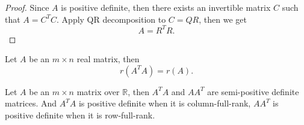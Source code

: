 \begin{proof}
  Since $A$ is positive definite, then there exists an invertible matrix $C$
  such that $A = C^TC$.
  Apply QR decomposition to $C = QR$, then we get
  \begin{equation}
    A = R^TR.
  \end{equation}
\end{proof}

\begin{lemma}{}{}
  Let $A$ be an $m \times n$ real matrix, then
  \begin{equation}
    r(A^TA) = r(A).
  \end{equation}
\end{lemma}

\begin{theorem}{}{}
  Let $A$ be an $m \times n$ matrix over $\mathbb{R}$,
  then $A^TA$ and $AA^T$ are semi-positive definite matrices.
  And $A^TA$ is positive definite when it is column-full-rank,
  $AA^T$ is positive definite when it is row-full-rank.
\end{theorem}






